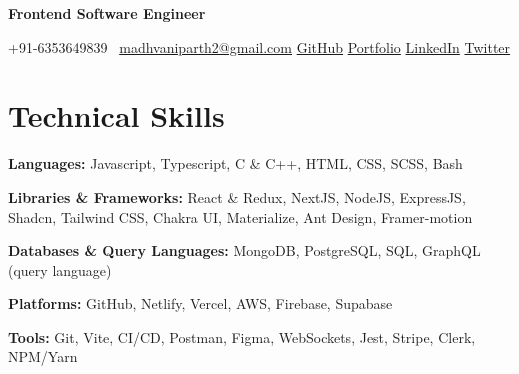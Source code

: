 \documentclass[11pt,a4paper,sans]{moderncv}
\begin{document}
\makecvtitle
\vspace*{-16mm}
\begin{center}\textbf{ Frontend Software Engineer }\end{center}

\begin{center}
{+91-6353649839}~ \quad \href{mailto:madhvaniparth2@gmail.com}{madhvaniparth2@gmail.com} \quad
\href{https://github.com/ParthMadhvani2}{\color{blue}GitHub} \quad
\href{https://parthmadhvani2.vercel.app/}{\color{blue}Portfolio}  \quad
\href{https://www.linkedin.com/in/parthmadhvani2/}{\color{blue}LinkedIn} \quad
\href{https://twitter.com/parthmadhvani2}{\color{blue}Twitter}
\end{center}



\section{Technical Skills}
\begin{itemize}[leftmargin=0in, label={}]
\normalsize{
    \item \textbf{Languages:} Javascript, Typescript, C \& C++, HTML, CSS, SCSS, Bash
    \item \textbf{Libraries \& Frameworks:} React \& Redux, NextJS, NodeJS, ExpressJS, Shadcn, Tailwind CSS, Chakra UI, Materialize, Ant Design, Framer-motion
    \item \textbf{Databases \& Query Languages:} MongoDB, PostgreSQL, SQL, GraphQL (query language)
    \item \textbf{Platforms:} GitHub, Netlify, Vercel, AWS, Firebase, Supabase
    \item \textbf{Tools:} Git, Vite, CI/CD, Postman, Figma, WebSockets, Jest, Stripe, Clerk, NPM/Yarn
}
\end{itemize}

\end{document}
